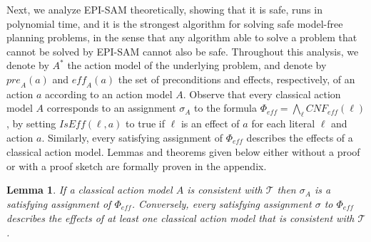 \documentclass{article}
\theoremstyle{plain}
\newtheorem{lemma}[theorem]{Lemma}
\theoremstyle{definition}
\theoremstyle{remark}
\theoremstyle{observation}
\newcommand{\tuple}[1]{\ensuremath{\left \langle #1 \right \rangle }}
\newcommand{\pre}{\textit{pre}}
\newcommand{\eff}{\textit{eff}}
\newcommand{\cnf}{\textit{CNF}}
\newcommand{\true}{\textit{true}}
\newcommand{\iseff}{\textit{IsEff}}
\newcommand{\ispre}{\textit{IsPre}}
\newcommand{\state}{\textit{State}}
\begin{document}
Next, we analyze EPI-SAM theoretically, showing that it is safe, runs in polynomial time, and it is the strongest algorithm for solving safe model-free planning problems, in the sense that any algorithm able to solve a problem that cannot be solved by EPI-SAM cannot also be safe. 
Throughout this analysis, we denote by $A^*$ the action model of the underlying problem, and denote by $\pre_A(a)$ and $\eff_A(a)$ the set of preconditions and effects, respectively, of an action $a$ according to an action model $A$. 
Observe that every classical action model $A$ corresponds to an assignment $\sigma_A$ to the formula $\Phi_\eff=\bigwedge_\ell \cnf_\eff(\ell)$, by setting $\iseff(\ell,a)$ to true if $\ell$ is an effect of $a$ for each literal $\ell$ and action $a$. 
Similarly, every satisfying assignment of $\Phi_\eff$ describes the effects of a classical action model. 
Lemmas and theorems given below either without a proof or with a proof sketch are formally proven in the appendix. 
\begin{lemma}\label{lem:cnf-char}
If a classical action model $A$ is consistent with $\mathcal{T}$
then $\sigma_A$ is a satisfying assignment of $\Phi_\eff$. 
Conversely, every satisfying assignment $\sigma$ to $\Phi_\eff$ describes the effects of at least one classical action model that is consistent with $\mathcal{T}$. 
\end{lemma}
\end{document}
